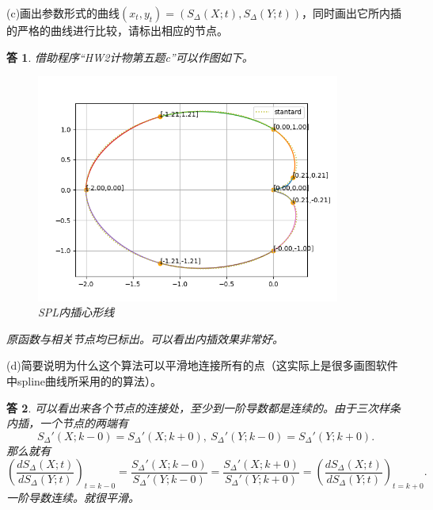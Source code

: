 \documentclass[10pt]{ctexart}
\newtheorem*{answer}{答}
\begin{document}
(c)画出参数形式的曲线$(x_t,y_t)=(S_{\Delta}(X;t),S_{\Delta}(Y;t))$，同时画出它所内插的严格的曲线进行比较，请标出相应的节点。
\begin{answer}
    借助程序“HW2计物第五题c”可以作图如下。
    \begin{figure}[H]
        \centering
        \includegraphics[width=10cm]{cardioid.png}
        \caption{SPL内插心形线}
    \end{figure}
    原函数与相关节点均已标出。可以看出内插效果非常好。
\end{answer}
(d)简要说明为什么这个算法可以平滑地连接所有的点（这实际上是很多画图软件中spline曲线所采用的的算法）。
\begin{answer}
    可以看出来各个节点的连接处，至少到一阶导数都是连续的。由于三次样条内插，一个节点的两端有
    $$S_{\Delta}'(X;k-0)=S_{\Delta}'(X;k+0),\ S_{\Delta}'(Y;k-0)=S_{\Delta}'(Y;k+0).$$
    那么就有
    $$\left(\frac{dS_{\Delta}(X;t)}{dS_{\Delta}(Y;t)}\right)_{t=k-0}=\frac{S_{\Delta}'(X;k-0)}{S_{\Delta}'(Y;k-0)}=\frac{S_{\Delta}'(X;k+0)}{S_{\Delta}'(Y;k+0)}=\left(\frac{dS_{\Delta}(X;t)}{dS_{\Delta}(Y;t)}\right)_{t=k+0}.$$
    一阶导数连续。就很平滑。
\end{answer}
\end{document}
